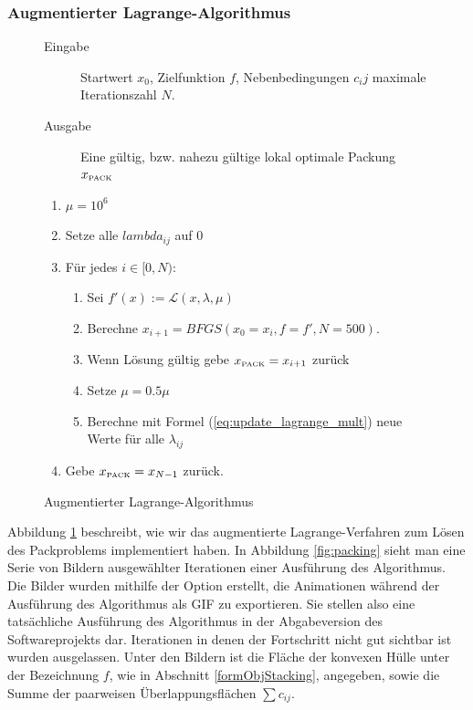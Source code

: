 \documentclass[runningheads,a4paper]{llncs}
\begin{document}
\subsubsection{Augmentierter Lagrange-Algorithmus}
\begin{figure}[ht]
 \centering
 \begin{description}
 \item[Eingabe] Startwert $x_0$, Zielfunktion $f$, Nebenbedingungen $c_ij$ maximale Iterationszahl $N$.
 \item[Ausgabe] Eine gültig, bzw. nahezu gültige lokal optimale Packung $x_{\text{\tiny{PACK}}}$
 \end{description}
 \begin{enumerate}
 	\item $\mu = 10^6$
 	\item Setze alle $lambda_{ij}$ auf $0$
 	\item Für jedes $i \in [0,N)$:
 	\begin{enumerate}
 	\item Sei $f'(x) := \mathcal{L}(x, \lambda, \mu)$
 	\item Berechne $x_{i+1} = BFGS(x_0=x_i, f=f', N=500)$.
 	\item Wenn Lösung gültig gebe $x_{\text{\tiny{PACK}}} = x_{i+1}$ zurück
 	\item Setze $\mu = 0.5\mu $
 	\item Berechne mit Formel (\ref{eq:update_lagrange_mult}) neue Werte für alle $\lambda_{ij}$
 	\end{enumerate}
 	\item Gebe $x_{\text{\tiny{PACK}}} = x_{N-1}$ zurück.
 \end{enumerate}
 \caption{Augmentierter Lagrange-Algorithmus}
 \label{alg:lagrange}
\end{figure}

Abbildung \ref{alg:lagrange} beschreibt, wie wir das augmentierte Lagrange-Verfahren zum Lösen des Packproblems implementiert haben. In Abbildung \ref{fig:packing} sieht man eine Serie von Bildern ausgewählter Iterationen einer Ausführung des Algorithmus. Die Bilder wurden mithilfe der Option erstellt, die Animationen während der Ausführung des Algorithmus als GIF zu exportieren. Sie stellen also eine tatsächliche Ausführung des Algorithmus in der Abgabeversion des Softwareprojekts dar. Iterationen in denen der Fortschritt nicht gut sichtbar ist wurden ausgelassen. Unter den Bildern ist die Fläche der konvexen Hülle unter der Bezeichnung $f$, wie in Abschnitt \ref{formObjStacking}, angegeben, sowie die Summe der paarweisen Überlappungsflächen $\sum c_{ij}$.
\end{document}
